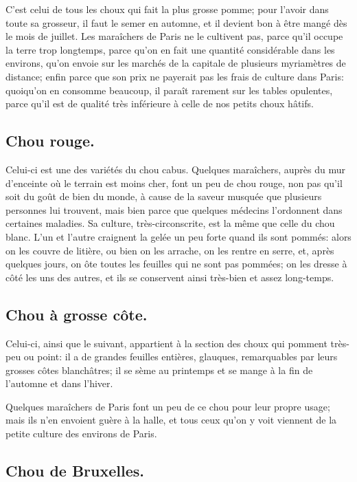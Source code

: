 \documentclass[10pt,a4paper]{book}
\begin{document}
C'est celui de tous les choux qui fait la plus grosse pomme; pour l'avoir dans toute sa grosseur, il faut le semer en automne, et il devient bon à être mangé dès le mois de juillet. Les maraîchers de Paris ne le cultivent pas, parce qu'il occupe la terre trop longtemps, parce qu'on en fait une quantité considérable dans les environs, qu'on envoie sur les marchés de la capitale de plusieurs myriamètres de distance; enfin parce que son prix ne payerait pas les frais de culture dans Paris: quoiqu'on en consomme beaucoup, il paraît rarement sur les tables opulentes, parce qu'il est de qualité très inférieure à celle de nos petits choux hâtifs.

\subsection{Chou rouge.}

Celui-ci est une des variétés du chou cabus. Quelques maraîchers, auprès du mur d'enceinte où le terrain est moins cher, font un peu de chou rouge, non pas qu'il soit du goût de bien du monde, à cause de la saveur musquée que plusieurs personnes lui trouvent, mais bien parce que quelques médecins l'ordonnent dans certaines maladies. Sa culture, très-circonscrite, est la même que celle du chou blanc. L'un et l'autre craignent la gelée un peu forte quand ils sont pommés: alors on les couvre de litière, ou bien on les arrache, on les rentre en serre, et, après quelques jours, on ôte toutes les feuilles qui ne sont pas pommées; on les dresse à côté les uns des autres, et ils se conservent ainsi très-bien et assez long-temps.

\subsection{Chou à grosse côte.}

Celui-ci, ainsi que le suivant, appartient à la section des choux qui pomment très-peu ou point: il a de grandes feuilles entières, glauques, remarquables par leurs grosses côtes blanchâtres; il se sème au printemps et se mange à la fin de l'automne et dans l'hiver.

Quelques maraîchers de Paris font un peu de ce chou pour leur propre usage; mais ils n'en envoient guère à la halle, et tous ceux qu'on y voit viennent de la petite culture des environs de Paris.

\subsection{Chou de Bruxelles.}
\end{document}
